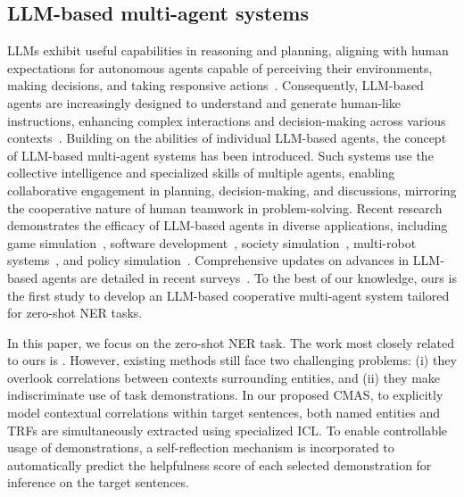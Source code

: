 \subsection{LLM-based multi-agent systems}
\acp{LLM} exhibit useful capabilities in reasoning and planning, aligning with human expectations for autonomous agents capable of perceiving their environments, making decisions, and taking responsive actions~\citep{DBLP:journals/corr/abs-2309-07864,DBLP:journals/ker/WooldridgeJ95,DBLP:journals/corr/abs-2305-18365,DBLP:conf/emnlp/Liang0RC0K23}. Consequently, \ac{LLM}-based agents are increasingly designed to understand and generate human-like instructions, enhancing complex interactions and decision-making across various contexts~\citep{DBLP:conf/nips/YaoYZS00N23,DBLP:conf/nips/ShinnCGNY23,DBLP:conf/emnlp/LiZ000YLHL23}. Building on the abilities of individual \ac{LLM}-based agents, the concept of \ac{LLM}-based multi-agent systems has been introduced. Such systems use the collective intelligence and specialized skills of multiple agents, enabling collaborative engagement in planning, decision-making, and discussions, mirroring the cooperative nature of human teamwork in problem-solving. 
Recent research demonstrates the efficacy of \ac{LLM}-based agents in diverse applications, including game simulation~\citep{DBLP:journals/corr/abs-2310-18940,DBLP:journals/corr/abs-2310-01320}, software development~\citep{DBLP:conf/iclr/HongZCZCWZWYLZR24,DBLP:journals/corr/abs-2307-07924}, society simulation~\citep{DBLP:conf/uist/ParkOCMLB23,DBLP:conf/uist/ParkPCMLB22}, multi-robot systems~\citep{DBLP:journals/corr/abs-2307-04738,DBLP:journals/corr/abs-2307-02485}, and policy simulation~\citep{DBLP:journals/corr/abs-2311-06957}. 
Comprehensive updates on advances in \ac{LLM}-based agents are detailed in recent surveys~\citep{DBLP:journals/corr/abs-2309-07864,DBLP:journals/fcsc/WangMFZYZCTCLZWW24,DBLP:journals/corr/abs-2402-01680}.
To the best of our knowledge, ours is the first study to develop an \ac{LLM}-based cooperative multi-agent system tailored for zero-shot \ac{NER} tasks.

In this paper, we focus on the zero-shot \ac{NER} task. The work most closely related to ours is \citep{wei2023zero,DBLP:conf/emnlp/XieLZZLW23,DBLP:journals/corr/abs-2311-08921}. However, existing methods still face two challenging problems: (i) they overlook correlations between contexts surrounding entities, and (ii)  they make indiscriminate use of task demonstrations.
In our proposed \ac{CMAS}, to explicitly model contextual correlations within target sentences, both named entities and \acp{TRF} are simultaneously extracted using specialized \ac{ICL}. To enable controllable usage of demonstrations, a self-reflection mechanism is incorporated to automatically predict the helpfulness score of each selected demonstration for inference on the target sentences.
 
